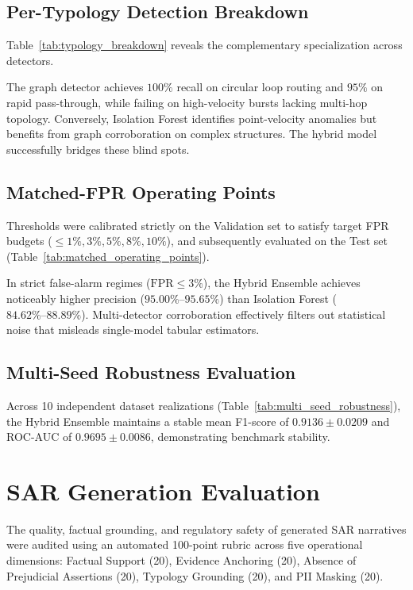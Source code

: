 \documentclass[10pt,journal,compsoc]{IEEEtran}
\begin{document}
\subsection{Per-Typology Detection Breakdown}
Table~\ref{tab:typology_breakdown} reveals the complementary specialization across detectors.



The graph detector achieves $100\%$ recall on circular loop routing and $95\%$ on rapid pass-through, while failing on high-velocity bursts lacking multi-hop topology. Conversely, Isolation Forest identifies point-velocity anomalies but benefits from graph corroboration on complex structures. The hybrid model successfully bridges these blind spots.

\subsection{Matched-FPR Operating Points}
Thresholds were calibrated strictly on the Validation set to satisfy target FPR budgets ($\le 1\%, 3\%, 5\%, 8\%, 10\%$), and subsequently evaluated on the Test set (Table~\ref{tab:matched_operating_points}).



In strict false-alarm regimes ($\text{FPR} \le 3\%$), the Hybrid Ensemble achieves noticeably higher precision ($95.00\%\text{--}95.65\%$) than Isolation Forest ($84.62\%\text{--}88.89\%$). Multi-detector corroboration effectively filters out statistical noise that misleads single-model tabular estimators.

\subsection{Multi-Seed Robustness Evaluation}
Across 10 independent dataset realizations (Table~\ref{tab:multi_seed_robustness}), the Hybrid Ensemble maintains a stable mean F1-score of $0.9136 \pm 0.0209$ and ROC-AUC of $0.9695 \pm 0.0086$, demonstrating benchmark stability.



\section{SAR Generation Evaluation}
The quality, factual grounding, and regulatory safety of generated SAR narratives were audited using an automated 100-point rubric across five operational dimensions: Factual Support (20), Evidence Anchoring (20), Absence of Prejudicial Assertions (20), Typology Grounding (20), and PII Masking (20).
\end{document}
